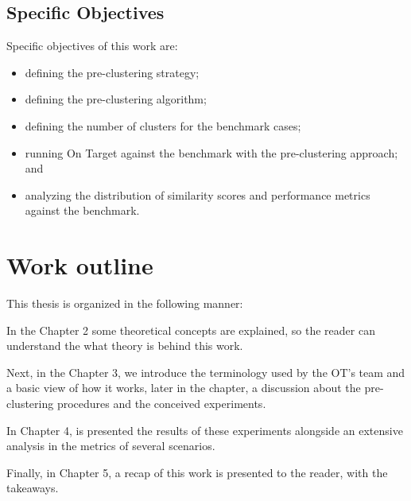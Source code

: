 \subsection{Specific Objectives}

Specific objectives of this work are:

\begin{itemize}
    \item defining the pre-clustering strategy;
	\item defining the pre-clustering algorithm;
    \item defining the number of clusters for the benchmark cases;
    \item running On Target against the benchmark with the pre-clustering approach; and
    \item analyzing the distribution of similarity scores and performance metrics against the benchmark.
\end{itemize}


\section{Work outline}

This thesis is organized in the following manner: 

In the Chapter 2 some theoretical concepts are explained, so the reader can understand the what theory is behind this work. 

Next, in the Chapter 3, we introduce the terminology used by the OT's team and a basic view of how it works, later in the chapter, a discussion about the pre-clustering procedures and the conceived experiments.

In Chapter 4, is presented the results of these experiments alongside an extensive analysis in the metrics of several scenarios. 
 
Finally, in Chapter 5, a recap of this work is presented to the reader, with the takeaways. 